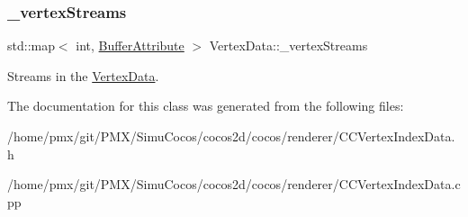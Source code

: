 \subsubsection{\texorpdfstring{\+\_\+vertex\+Streams}{\_vertexStreams}}
{\footnotesize\ttfamily std\+::map$<$ int, \hyperlink{structVertexData_1_1BufferAttribute}{Buffer\+Attribute} $>$ Vertex\+Data\+::\+\_\+vertex\+Streams\hspace{0.3cm}{\ttfamily [protected]}}

Streams in the \hyperlink{classVertexData}{Vertex\+Data}. 

The documentation for this class was generated from the following files\+:\begin{DoxyCompactItemize}
\item 
/home/pmx/git/\+P\+M\+X/\+Simu\+Cocos/cocos2d/cocos/renderer/C\+C\+Vertex\+Index\+Data.\+h\item 
/home/pmx/git/\+P\+M\+X/\+Simu\+Cocos/cocos2d/cocos/renderer/C\+C\+Vertex\+Index\+Data.\+cpp\end{DoxyCompactItemize}
